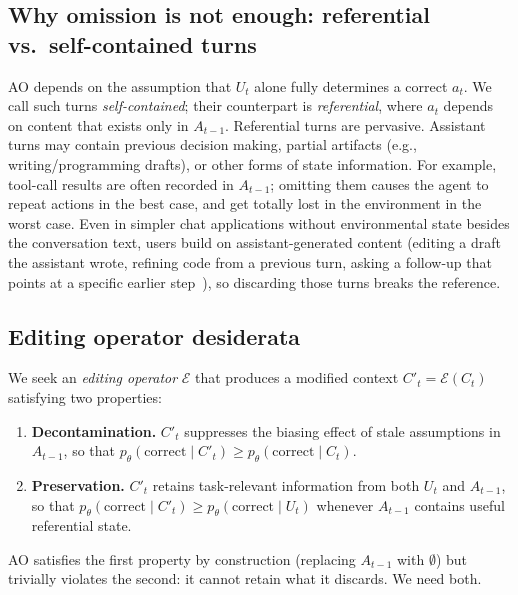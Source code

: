 \documentclass{article}
\begin{document}
\subsection{Why omission is not enough: referential vs.\ self-contained turns}
\label{sec:referential}
AO depends on the assumption that $U_t$ alone fully determines a correct $a_t$. We call such turns \emph{self-contained}; their counterpart is \emph{referential}, where $a_t$ depends on content that exists only in $A_{t-1}$. Referential turns are pervasive. Assistant turns may contain previous decision making, partial artifacts (e.g., writing/programming drafts), or other forms of state information. For example, tool-call results are often recorded in $A_{t-1}$; omitting them causes the agent to repeat actions in the best case, and get totally lost in the environment in the worst case. Even in simpler chat applications without environmental state besides the conversation text, users build on assistant-generated content (editing a draft the assistant wrote, refining code from a previous turn, asking a follow-up that points at a specific earlier step~\citep{huang2026context}), so discarding those turns breaks the reference.

\subsection{Editing operator desiderata}
We seek an \emph{editing operator} $\mathcal{E}$ that produces a modified context $C'_t = \mathcal{E}(C_t)$ satisfying two properties:
\begin{enumerate}
    \item \textbf{Decontamination.} $C'_t$ suppresses the biasing effect of stale assumptions in $A_{t-1}$, so that $p_\theta(\text{correct} \mid C'_t) \geq p_\theta(\text{correct} \mid C_t)$.
    \item \textbf{Preservation.} $C'_t$ retains task-relevant information from both $U_t$ and $A_{t-1}$, so that $p_\theta(\text{correct} \mid C'_t) \geq p_\theta(\text{correct} \mid U_t)$ whenever $A_{t-1}$ contains useful referential state.
\end{enumerate}
AO satisfies the first property by construction (replacing $A_{t-1}$ with $\emptyset$) but trivially violates the second: it cannot retain what it discards. We need both.
\end{document}
